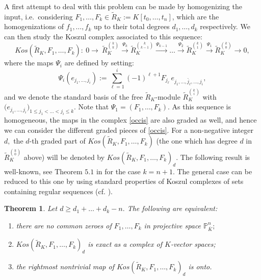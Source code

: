 \documentclass[a4paper,11pt]{amsart}
\renewcommand{\P}{\mathbb{P}}
\newcounter{thm}
\numberwithin{thm}{section}
\numberwithin{equation}{section}
\theoremstyle{definition}
\theoremstyle{plain}
\newtheorem{theorem}[thm]{Theorem}
\begin{document}
A first attempt to deal with this problem can be made by homogenizing the input, i.e.~considering $F_1,\ldots, F_k\in \tilde{R}_K:=K[t_0,\ldots,t_n]$, which are the homogenizations of $f_1,\ldots, f_k$ up to their total degrees $d_1,\ldots, d_k$ respectively. We can then  study the Koszul complex associated to this sequence:
\begin{equation}\label{occis}
Kos(\tilde{R}_K,F_1,\ldots, F_k):\ 0\to\ \tilde{R}_K^{k\choose k}\stackrel{\Psi_k}{\to} \tilde{R}_K^{k\choose k-1}\stackrel{\Psi_{k-1}}{\to}\ldots\stackrel{\Psi_2}{\to} \tilde{R}_K^{k\choose1}\stackrel{\Psi_1}{\to} \tilde{R}_K^{k\choose 0}\to 0,
\end{equation}
 where the maps $\Psi_i$ are defined by setting:
\begin{equation}\label{axi}
\Psi_i(e_{j_1,\ldots, j_i}):=\sum_{\ell=1}^i (-1)^{\ell+1} F_{j_\ell}\, e_{j_1,\ldots, \check{j_\ell},\ldots, j_i},
\end{equation}
and we denote the standard basis of the free $\tilde{R}_K$-module $ \tilde{R}_K^{k\choose i}$ with $\big(e_{j_1,\ldots, j_i}\big)_{1\leq j_1<\ldots <j_i\leq k}.$
Note that $\Psi_1=(F_1,\ldots, F_k).$
As this sequence is homogeneous, the maps in the complex \eqref{occis} are also graded as well, and hence we can consider the different graded pieces of \eqref{occis}. For a non-negative integer $d,$ the  $d$-th graded part of $Kos(\tilde{R}_K,F_1,\ldots, F_k)$ (the one which has degree $d$ in $\tilde{R}_K^{k\choose 0}$ above) will be denoted by $Kos(\tilde{R}_K,F_1,\ldots, F_k)_d.$
The following result is well-known, see Theorem $5.1$ in \cite{DD01} for the case $k=n+1.$ The general case can be reduced to this one by using standard properties of Koszul complexes of sets containing regular sequences (cf. \cite[Corollary 1.6.13]{BH93}).
\begin{theorem}\label{g0}
Let  $d\geq d_1+\ldots+d_k-n.$ The following are equivalent:
\begin{enumerate}
\item there are no common zeroes of $F_1,\ldots, F_k$ in projective space $\P^n_{\overline{K}};$
\item $Kos(\tilde{R}_K,F_1,\ldots, F_k)_d$ is exact as a complex of $K$-vector spaces;
\item the rightmost nontrivial map of $Kos(\tilde{R}_K,F_1,\ldots, F_k)_d$ is onto.
\end{enumerate}
\end{theorem}
\end{document}

